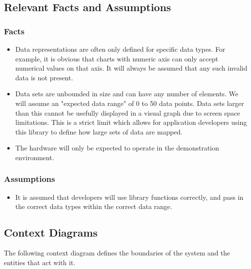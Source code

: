 \documentclass[12pt, titlepage]{article}
\begin{document}
\subsection{Relevant Facts and Assumptions}
\subsubsection{Facts}
\begin{itemize}
    \item Data representations are often only defined for specific data types. For example, it is obvious that charts with numeric axis can only accept numerical values on that axis. It will always be assumed that any such invalid data is not present.
    \item Data sets are unbounded in size and can have any number of elements. We will assume an "expected data range" of 0 to 50 data points. Data sets larger than this cannot be usefully displayed in a visual graph due to screen space limitations. This is a strict limit which allows for application developers using this library to define how large sets of data are mapped.    
    \item The hardware will only be expected to operate in the demonstration environment.
\end{itemize}

\subsubsection{Assumptions}
\begin{itemize}
    \item It is assumed that developers will use library functions correctly, and pass in the correct data types within the correct data range.
\end{itemize}

\subsection{Context Diagrams}
The following context diagram defines the boundaries of the system and the entities that act with it. 
\end{document}

